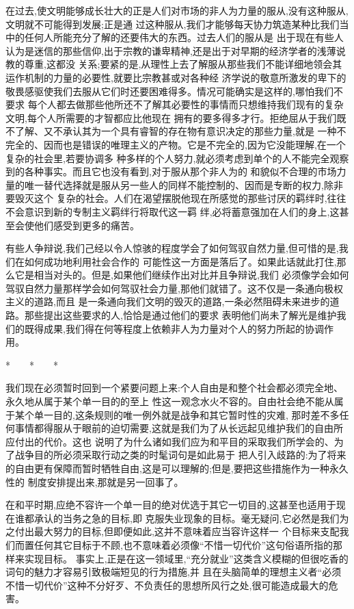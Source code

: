 ﻿\documentclass[12pt]{article}
\begin{document}
在过去,使文明能够成长壮大的正是人们对市场的非人为力量的服从,没有这种服从,文明就不可能得到发展;正是通
过这种服从,我们才能够每天协力筑造某种比我们当中的任何人所能充分了解的还要伟大的东西。过去人们的服从是
出于现在有些人认为是迷信的那些信仰,出于宗教的谦卑精神,还是出于对早期的经济学者的浅薄说教的尊重,这都没
关系;要紧的是,从理性上去了解服从那些我们不能详细地领会其运作机制的力量的必要性,就要比宗教甚或对各种经
济学说的敬意所激发的卑下的敬畏感驱使我们去服从它们时还要困难得多。情况可能确实是这样的,哪怕我们不要求
每个人都去做那些他所还不了解其必要性的事情而只想维持我们现有的复杂文明,每个人所需要的才智都应比他现在
拥有的要多得多才行。拒绝屈从于我们既不了解、又不承认其为一个具有睿智的存在物有意识决定的那些力量,就是
一种不完全的、因而也是错误的唯理主义的产物。它是不完全的,因为它没能理解,在一个复杂的社会里,若要协调多
种多样的个人努力,就必须考虑到单个的人不能完全观察到的各种事实。而且它也没有看到,对于服从那个非人为的
和貌似不合理的市场力量的唯一替代选择就是服从另一些人的同样不能控制的、因而是专断的权力,除非要毁灭这个
复杂的社会。人们在渴望摆脱他现在所感觉的那些讨厌的羁绊时,往往不会意识到新的专制主义羁绊行将取代这一羁
绊,必将蓄意强加在人们的身上,这甚至会使他们感受到更多的痛苦。

有些人争辩说,我们己经以令人惊骇的程度学会了如何驾驭自然力量,但可惜的是,我们在如何成功地利用社会合作的
可能性这一方面是落后了。如果此话就此打住,那么它是相当对头的。但是,如果他们继续作出对比并且争辩说,我们
必须像学会如何驾驭自然力量那样学会如何驾驭社会力量,那他们就错了。这不仅是一条通向极权主义的道路,而且
是一条通向我们文明的毁灭的道路,一条必然阻碍未来进步的道路。那些提出这些要求的人,恰恰是通过他们的要求
表明他们尚未了解光是维护我们的既得成果,我们得在何等程度上依赖非人为力量对个人的努力所起的协调作用。

*　　*　　*

我们现在必须暂时回到一个紧要问题上来:个人自由是和整个社会都必须完全地、永久地从属于某个单一目的的至上
性这一观念水火不容的。自由社会绝不能从属于某个单一目的,这条规则的唯一例外就是战争和其它暂时性的灾难,
那时差不多任何事情都得服从于眼前的迫切需要,这就是我们为了从长远起见维护我们的自由所应付出的代价。这也
说明了为什么诸如我们应为和平目的采取我们所学会的、为了战争目的所必须采取行动之类的时髦词句是如此易于
把人引入歧路的:为了将来的自由更有保障而暂时牺牲自由,这是可以理解的;但是,要把这些措施作为一种永久性的
制度安排提出来,那就是另一回事了。

在和平时期,应绝不容许一个单一目的绝对优选于其它一切目的,这甚至也适用于现在谁都承认的当务之急的目标,即
克服失业现象的目标。毫无疑问,它必然是我们为之付出最大努力的目标,但即便如此,这并不意味着应当容许这样一
个目标来支配我们而置任何其它目标于不顾,也不意味着必须像``不惜一切代价''这句俗语所指的那样来实现目标。
事实上,正是在这一领域里,``充分就业''这类含义模糊的但很吃香的词句的魅力才容易引致极端短见的行为措施,并
且在头脑简单的理想主义者``必须不惜一切代价''这种不分好歹、不负责任的思想所风行之处,很可能造成最大的危
害。
\end{document}
